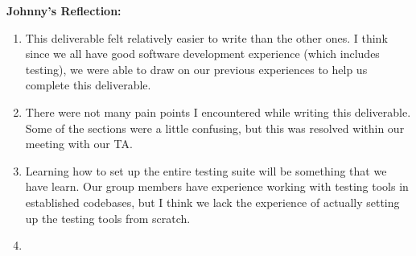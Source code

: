 \documentclass[12pt, titlepage]{article}
\begin{document}
\noindent\textbf{Johnny's Reflection:}
\begin{enumerate}
  \item This deliverable felt relatively easier to write than the other ones. I think since we all have good software development experience (which includes testing), we were able to draw on our previous experiences to help us complete this deliverable.
  \item There were not many pain points I encountered while writing this deliverable. Some of the sections were a little confusing, but this was resolved within our meeting with our TA.
  \item Learning how to set up the entire testing suite will be something that we have learn. Our group members have experience working with testing tools in established codebases, but I think we lack the experience of actually setting up the testing tools from scratch.
  \item 
\end{enumerate}
\end{document}
